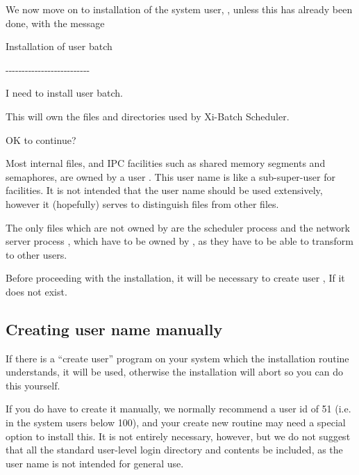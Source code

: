 {\begin{expara}

\end{expara}

We now move on to installation of the system user, \batchuser{},
unless this has already been done, with the message

\begin{expara}

Installation of user batch

{}-{}-{}-{}-{}-{}-{}-{}-{}-{}-{}-{}-{}-{}-{}-{}-{}-{}-{}-{}-{}-{}-{}-{}-{}-{}-

\bigskip

I need to install user {\textquotedbl}batch{\textquotedbl}.

\bigskip

This will own the files and directories used by Xi-Batch Scheduler.

\bigskip

OK to continue?

\end{expara}

Most internal files, and IPC facilities such as shared memory segments
and semaphores, are owned by a user \batchuser{}. This
user name is like a {\textquotedbl}sub-super-user{\textquotedbl} for
\ProductName{} facilities. It is not intended that the
\batchuser{} user name should be used extensively, however
it (hopefully) serves to distinguish \ProductName{} files from other files.

The only files which are not owned by \batchuser{} are the
scheduler process  and the network server
process , which have to be owned by
, as they have to be able to transform to other
users.

Before proceeding with the installation, it will be necessary to create
user \batchuser{}, If it does not exist.

\subsection{Creating user name manually}
If there is a {\textquotedblleft}create user{\textquotedblright} program
on your system which the installation routine understands, it will be
used, otherwise the installation will abort so you can do this
yourself.

If you do have to create it manually, we normally recommend a user id of
51 (i.e. in the {\textquotedbl}system users{\textquotedbl} below 100),
and your {\textquotedbl}create new
 routine may need a special
option to install this. It is not entirely necessary, however, but we
do not suggest that all the standard user-level login directory and
contents be included, as the user name is not intended for general use.

}
